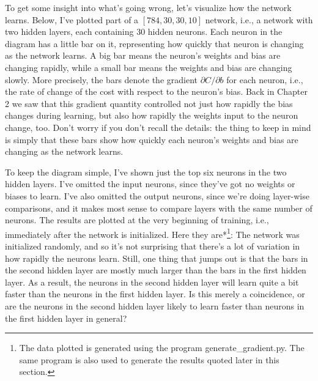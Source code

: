 To get some insight into what's going wrong, let's visualize how the network learns. Below, I've plotted part of a $[784, 30, 30, 10]$ network, i.e., a network with two hidden layers, each containing $30$ hidden neurons. Each neuron in the diagram has a little bar on it, representing how quickly that neuron is changing as the network learns. A big bar means the neuron's weights and bias are changing rapidly, while a small bar means the weights and bias are changing slowly. More precisely, the bars denote the gradient $\partial C / \partial b$ for each neuron, i.e., the rate of change of the cost with respect to the neuron's bias. Back in Chapter 2 we saw that this gradient quantity controlled not just how rapidly the bias changes during learning, but also how rapidly the weights input to the neuron change, too. Don't worry if you don't recall the details: the thing to keep in mind is simply that these bars show how quickly each neuron's weights and bias are changing as the network learns.


To keep the diagram simple, I've shown just the top six neurons in the two hidden layers. I've omitted the input neurons, since they've got no weights or biases to learn. I've also omitted the output neurons, since we're doing layer-wise comparisons, and it makes most sense to compare layers with the same number of neurons. The results are plotted at the very beginning of training, i.e., immediately after the network is initialized. Here they are*\footnote{The data plotted is generated using the program generate\_\allowbreak{}gradient.py. The same program is also used to generate the results quoted later in this section.}: The network was initialized randomly, and so it's not surprising that there's a lot of variation in how rapidly the neurons learn. Still, one thing that jumps out is that the bars in the second hidden layer are mostly much larger than the bars in the first hidden layer. As a result, the neurons in the second hidden layer will learn quite a bit faster than the neurons in the first hidden layer. Is this merely a coincidence, or are the neurons in the second hidden layer likely to learn faster than neurons in the first hidden layer in general?


